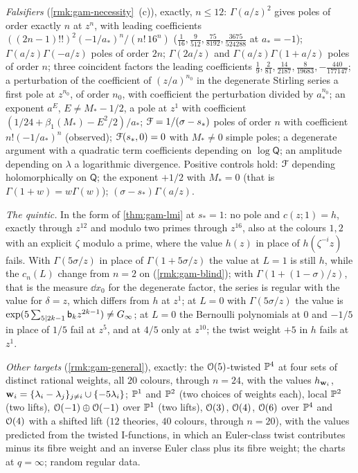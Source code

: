 \emph{Falsifiers} (\cref{rmk:gam-necessity}~(c)), exactly, $n\leq 12$: $\Gamma(a/z)^2$ gives poles of order exactly $n$ at $z^n$, with leading coefficients $((2n-1)!!)^2(-1/a_*)^n/(n!\,16^n)$ ($\tfrac1{16},\tfrac9{512},\tfrac{75}{8192},\tfrac{3675}{524288}$ at $a_*=-1$); $\Gamma(a/z)\Gamma(-a/z)$ poles of order $2n$; $\Gamma(2a/z)$ and $\Gamma(a/z)\Gamma(1+a/z)$ poles of order $n$; three coincident factors the leading coefficients $\tfrac19,\tfrac2{81},\tfrac{14}{2187},\tfrac8{19683},-\tfrac{440}{177147}$; a perturbation of the coefficient of $(z/a)^{n_0}$ in the degenerate Stirling series a first pole at $z^{n_0}$, of order $n_0$, with coefficient the perturbation divided by $a_*^{n_0}$; an exponent $a^E$, $E\neq M_*-1/2$, a pole at $z^1$ with coefficient $(1/24+\beta_1(M_*)-E^2/2)/a_*$; $\mathcal{F}=1/(\sigma-s_*)$ poles of order $n$ with coefficient $n!(-1/a_*)^n$ (observed); $\mathcal{F}(s_*,0)=0$ with $M_*\neq 0$ simple poles; a degenerate argument with a quadratic term coefficients depending on $\log\mathsf Q$; an amplitude depending on $\lambda$ a logarithmic divergence. Positive controls hold: $\mathcal{F}$ depending holomorphically on $\mathsf Q$; the exponent $+1/2$ with $M_*=0$ (that is $\Gamma(1+w)=w\Gamma(w)$); $(\sigma-s_*)\Gamma(a/z)$.

\emph{The quintic.} In the form of \cref{thm:gam-lmi} at $s_*=1$: no pole and $c(z;1)=h$, exactly through $z^{12}$ and modulo two primes through $z^{16}$, also at the colours $1,2$ with an explicit $\zeta$ modulo a prime, where the value $h(z)$ in place of $h(\zeta^{-i}z)$ fails. With $\Gamma(5\sigma/z)$ in place of $\Gamma(1+5\sigma/z)$ the value at $L=1$ is still $h$, while the $c_n(L)$ change from $n=2$ on (\cref{rmk:gam-blind}); with $\Gamma(1+(1-\sigma)/z)$, that is the measure $\dd x_0$ for the degenerate factor, the series is regular with the value for $\delta=z$, which differs from $h$ at $z^1$; at $L=0$ with $\Gamma(5\sigma/z)$ the value is $\exp(5\sum_{5\mid 2k-1}\mathsf{b}_kz^{2k-1})\neq G_{\infty}$; at $L=0$ the Bernoulli polynomials at $0$ and $-1/5$ in place of $1/5$ fail at $z^5$, and at $4/5$ only at $z^{10}$; the twist weight $+5$ in $h$ fails at $z^1$.

\emph{Other targets} (\cref{rmk:gam-general}), exactly: the $\mathcal{O}(5)$-twisted $\mathbb{P}^4$ at four sets of distinct rational weights, all $20$ colours, through $n=24$, with the values $h_{\mathbf{w}_i}$, $\mathbf{w}_i=\{\lambda_i-\lambda_j\}_{j\neq i}\cup\{-5\lambda_i\}$; $\mathbb{P}^1$ and $\mathbb{P}^2$ (two choices of weights each), local $\mathbb{P}^2$ (two lifts), $\mathcal{O}(-1)\oplus\mathcal{O}(-1)$ over $\mathbb{P}^1$ (two lifts), $\mathcal{O}(3)$, $\mathcal{O}(4)$, $\mathcal{O}(6)$ over $\mathbb{P}^4$ and $\mathcal{O}(4)$ with a shifted lift ($12$ theories, $40$ colours, through $n=20$), with the values predicted from the twisted I-functions, in which an Euler-class twist contributes minus its fibre weight and an inverse Euler class plus its fibre weight; the charts at $q=\infty$; random regular data.

